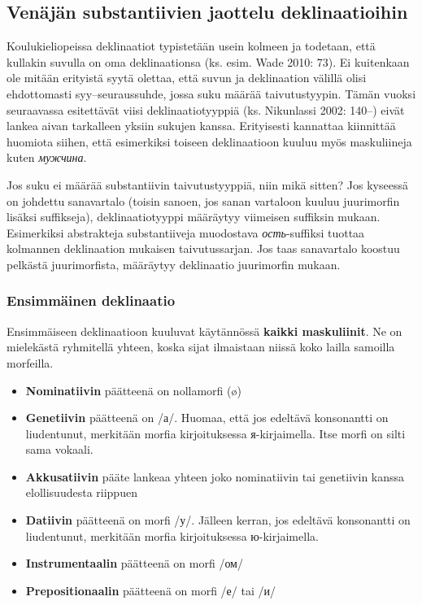 \documentclass[]{scrartcl}
\providecommand{\tightlist}{%
  \setlength{\itemsep}{0pt}\setlength{\parskip}{0pt}}
\begin{document}
\subsection{Venäjän substantiivien jaottelu
deklinaatioihin}\label{venuxe4juxe4n-substantiivien-jaottelu-deklinaatioihin}

Koulukieliopeissa deklinaatiot typistetään usein kolmeen ja todetaan,
että kullakin suvulla on oma deklinaationsa (ks. esim. Wade 2010: 73).
Ei kuitenkaan ole mitään erityistä syytä olettaa, että suvun ja
deklinaation välillä olisi ehdottomasti syy--seuraussuhde, jossa suku
määrää taivutustyypin. Tämän vuoksi seuraavassa esitettävät viisi
deklinaatiotyyppiä (ks. Nikunlassi 2002: 140--) eivät lankea aivan
tarkalleen yksiin sukujen kanssa. Erityisesti kannattaa kiinnittää
huomiota siihen, että esimerkiksi toiseen deklinaatioon kuuluu myös
maskuliineja kuten \emph{мужчина}.

Jos suku ei määrää substantiivin taivutustyyppiä, niin mikä sitten? Jos
kyseessä on johdettu sanavartalo (toisin sanoen, jos sanan vartaloon
kuuluu juurimorfin lisäksi suffikseja), deklinaatiotyyppi määräytyy
viimeisen suffiksin mukaan. Esimerkiksi abstrakteja substantiiveja
muodostava \emph{ость}-suffiksi tuottaa kolmannen deklinaation mukaisen
taivutussarjan. Jos taas sanavartalo koostuu pelkästä juurimorfista,
määräytyy deklinaatio juurimorfin mukaan.

\subsubsection{Ensimmäinen
deklinaatio}\label{ensimmuxe4inen-deklinaatio}

Ensimmäiseen deklinaatioon kuuluvat käytännössä \textbf{kaikki
maskuliinit}. Ne on mielekästä ryhmitellä yhteen, koska sijat ilmaistaan
niissä koko lailla samoilla morfeilla.

\begin{itemize}
\tightlist
\item
  \textbf{Nominatiivin} päätteenä on nollamorfi (ø)
\item
  \textbf{Genetiivin} päätteenä on /а/. Huomaa, että jos edeltävä
  konsonantti on liudentunut, merkitään morfia kirjoituksessa
  я-kirjaimella. Itse morfi on silti sama vokaali.
\item
  \textbf{Akkusatiivin} pääte lankeaa yhteen joko nominatiivin tai
  genetiivin kanssa elollisuudesta riippuen
\item
  \textbf{Datiivin} päätteenä on morfi /у/. Jälleen kerran, jos edeltävä
  konsonantti on liudentunut, merkitään morfia kirjoituksessa
  ю-kirjaimella.
\item
  \textbf{Instrumentaalin} päätteenä on morfi /ом/
\item
  \textbf{Prepositionaalin} päätteenä on morfi /е/ tai /и/
\end{itemize}
\end{document}
